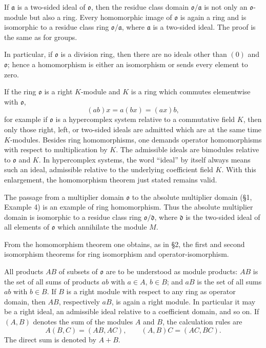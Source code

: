 \documentclass[11pt]{article}
\begin{document}
If \(\mathfrak a\) is a two-sided ideal of \(\mathfrak{o}\), then the
residue class domain \(\mathfrak{o}/\mathfrak a\) is not only an
\(\mathfrak{o}\)-module but also a ring. Every homomorphic image of
\(\mathfrak{o}\) is again a ring and is isomorphic to a residue class
ring \(\mathfrak{o}/\mathfrak a\), where \(\mathfrak a\) is a two-sided
ideal. The proof is the same as for groups.

In particular, if \(\mathfrak{o}\) is a division ring, then there are no
ideals other than \((0)\) and \(\mathfrak{o}\); hence a homomorphism is
either an isomorphism or sends every element to zero.

If the ring \(\mathfrak{o}\) is a right \(K\)-module and \(K\) is a ring
which commutes elementwise with \(\mathfrak{o}\), \[
  (ab)x=a(bx)=(ax)b,
\] for example if \(\mathfrak{o}\) is a hypercomplex system relative to
a commutative field \(K\), then only those right, left, or two-sided
ideals are admitted which are at the same time \(K\)-modules. Besides
ring homomorphisms, one demands operator homomorphisms with respect to
multiplication by \(K\). The admissible ideals are bimodules relative to
\(\mathfrak{o}\) and \(K\). In hypercomplex systems, the word ``ideal''
by itself always means such an ideal, admissible relative to the
underlying coefficient field \(K\). With this enlargement, the
homomorphism theorem just stated remains valid.

The passage from a multiplier domain \(\mathfrak{o}\) to the absolute
multiplier domain (§1, Example 4) is an example of ring homomorphism.
Thus the absolute multiplier domain is isomorphic to a residue class
ring \(\mathfrak{o}/\mathfrak d\), where \(\mathfrak d\) is the
two-sided ideal of all elements of \(\mathfrak{o}\) which annihilate the
module \(M\).

From the homomorphism theorem one obtains, as in §2, the first and
second isomorphism theorems for ring isomorphism and
operator-isomorphism.

All products \(AB\) of subsets of \(\mathfrak{o}\) are to be understood
as module products: \(AB\) is the set of all sums of products \(ab\)
with \(a\in A\), \(b\in B\); and \(aB\) is the set of all sums \(ab\)
with \(b\in B\). If \(B\) is a right module with respect to any ring as
operator domain, then \(AB\), respectively \(aB\), is again a right
module. In particular it may be a right ideal, an admissible ideal
relative to a coefficient domain, and so on. If \((A,B)\) denotes the
sum of the modules \(A\) and \(B\), the calculation rules are \[
  A(B,C)=(AB,AC),
  \qquad
  (A,B)C=(AC,BC).
\] The direct sum is denoted by \(A+B\).
\end{document}
